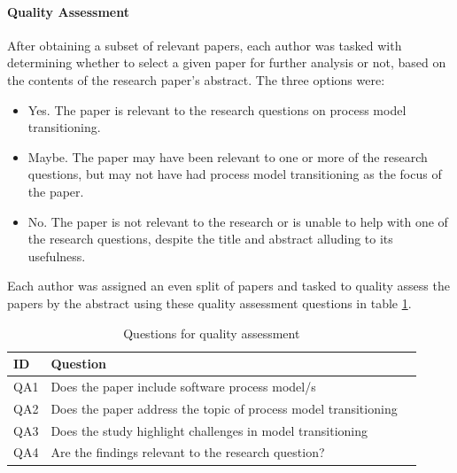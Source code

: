 \documentclass[conference]{IEEEtran}
\begin{document}
\paragraph{Quality Assessment}
After obtaining a subset of relevant papers, each author was tasked with determining whether to select a given paper for further analysis or not, based on the contents of the research paper's abstract. The three options were:
\begin{itemize}
\item Yes. The paper is relevant to the research questions on process model transitioning.
\item Maybe. The paper may have been relevant to one or more of the research questions, but may not have had process model transitioning as the focus of the paper.
\item No. The paper is not relevant to the research or is unable to help with one of the research questions, despite the title and abstract alluding to its usefulness.
\end{itemize}
Each author was assigned an even split of papers and tasked to quality assess the papers by the abstract using these quality assessment questions in table \ref{tab:QAQ}.

\begin{table}[h!]
    \centering
    \label{tab:QAQ}
    \caption{Questions for quality assessment}
    \begin{tabular}{l p{7.3cm} r} 
        \hline 
        \textbf{ID}  &  \textbf{Question}\\ \hline
        QA1 & Does the paper include software process model/s \\[2mm]
        QA2 & Does the paper address the topic of process model transitioning \\[2mm]
        QA3 & Does the study highlight challenges in model transitioning \\[2mm]
        QA4 & Are the findings relevant to the research question?
        \\[2mm] \hline
    \end{tabular} \vspace{2mm}
\end{table}
\end{document}
